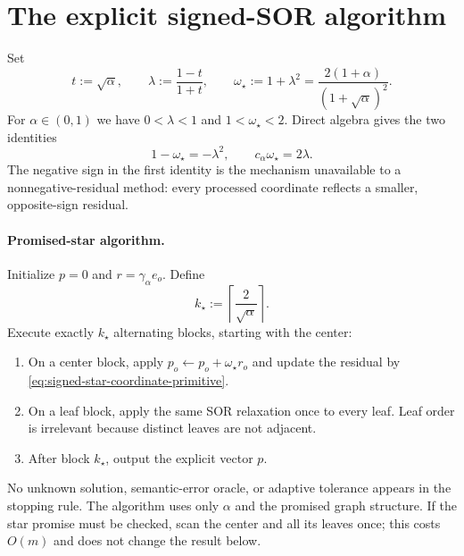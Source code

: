 \section{The explicit signed-SOR algorithm}
\label{sec:signed-star-algorithm}

Set
\begin{equation}
  t:=\sqrt\alpha,
  \qquad
  \lambda:=\frac{1-t}{1+t},
  \qquad
  \omega_\star:=1+\lambda^2
  =\frac{2(1+\alpha)}{(1+\sqrt\alpha)^2}.
  \label{eq:signed-star-optimal-parameters}
\end{equation}
For $\alpha\in(0,1)$ we have $0<\lambda<1$ and
$1<\omega_\star<2$.  Direct algebra gives the two identities
\begin{equation}
  1-\omega_\star=-\lambda^2,
  \qquad
  c_\alpha\omega_\star=2\lambda.
  \label{eq:signed-star-sor-identities}
\end{equation}
The negative sign in the first identity is the mechanism unavailable to a
nonnegative-residual method: every processed coordinate reflects a smaller,
opposite-sign residual.

\paragraph{Promised-star algorithm.}
Initialize $p=0$ and $r=\gamma_\alpha e_o$.  Define
\begin{equation}
  k_\star:=\left\lceil\frac{2}{\sqrt\alpha}\right\rceil.
  \label{eq:signed-star-predetermined-stop}
\end{equation}
Execute exactly $k_\star$ alternating blocks, starting with the center:

\begin{enumerate}[leftmargin=*,label=\arabic*.]
\item On a center block, apply
      $p_o\leftarrow p_o+\omega_\star r_o$ and update the residual by
      \eqref{eq:signed-star-coordinate-primitive}.
\item On a leaf block, apply the same SOR relaxation once to every leaf.
      Leaf order is irrelevant because distinct leaves are not adjacent.
\item After block $k_\star$, output the explicit vector $p$.
\end{enumerate}

No unknown solution, semantic-error oracle, or adaptive tolerance appears in
the stopping rule.  The algorithm uses only $\alpha$ and the promised graph
structure.  If the star promise must be checked, scan the center and all its
leaves once; this costs $O(m)$ and does not change the result below.

